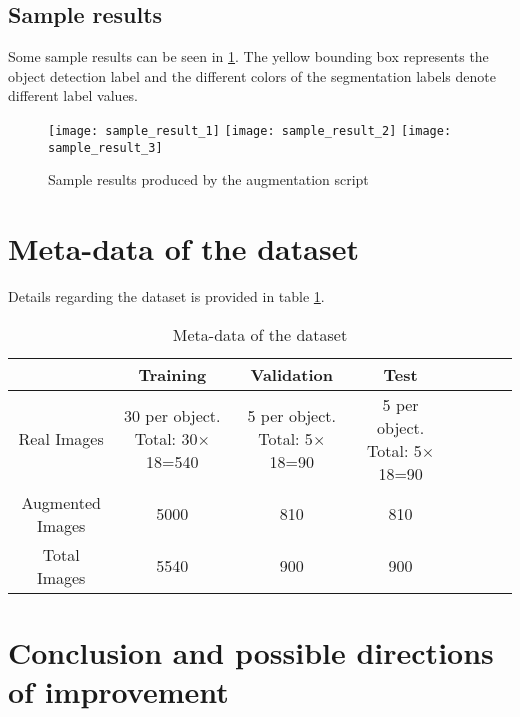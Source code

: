 \documentclass[paper=a4,11pt,parskip=half,toc=listof]{scrartcl}
\begin{document}
\subsection{Sample results}
Some sample results can be seen in \ref{Fig:8}. The yellow bounding box represents the object detection label and the different colors of the segmentation labels denote different label values.

	\begin{figure}[htb!]
		\centering
		\texttt{[image: sample\_result\_1]}
		\texttt{[image: sample\_result\_2]}
		\texttt{[image: sample\_result\_3]}
		\caption{Sample results produced by the augmentation script}
		\label{Fig:8}
	\end{figure}
	

\section{Meta-data of the dataset}

Details regarding the dataset is provided in table \ref{Table:3}.

\begin{table}[!htb]
\centering
\begin{tabular}{|c|c|c|c|c|c|c|c|}
\hline 
    & Training & Validation & Test \\ 
\hline 
Real Images & \makecell{30 per object.\\ Total: 30$\times$18=540} & \makecell{5 per object.\\ Total: 5$\times$18=90} & \makecell{5 per object.\\ Total: 5$\times$18=90} \\ 
\hline 
Augmented Images & 5000 & 810 & 810 \\ 
\hline 
Total Images & 5540 & 900 & 900 \\ 
\hline 
\end{tabular}
\caption{Meta-data of the dataset} 
\label{Table:3}
\end{table}

\section{Conclusion and possible directions of improvement}
\end{document}
